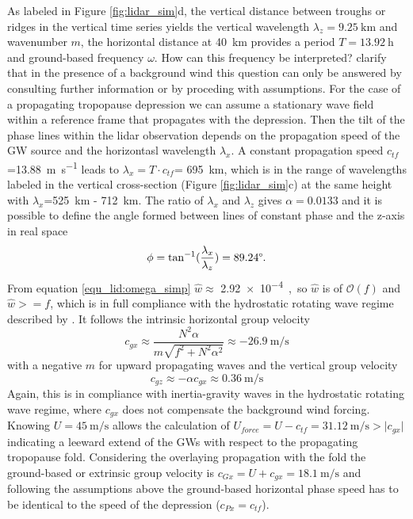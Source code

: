As labeled in Figure \ref{fig:lidar_sim}d, the vertical distance between troughs or ridges in the vertical time series yields the vertical wavelength $\lambda_z=\SI{9.25}{\kilo \meter}$ and wavenumber $m$, the horizontal distance at \SI{40}{\kilo \meter} provides a period $T=\SI{13.92}{\hour}$ and ground-based frequency $\omega$. How can this frequency be interpreted? \textcite[]{dornbrack_interpretation_2017} clarify that in the presence of a background wind this question can only be answered by consulting further information or by proceding with assumptions. For the case of a propagating tropopause depression we can assume a stationary wave field within a reference frame that propagates with the depression. Then the tilt of the phase lines within the lidar observation depends on the propagation speed of the GW source and the horizontasl wavelength $\lambda_x$. A constant propagation speed $c_{tf}$=\SI{13.88}{\meter \per \second} leads to $\lambda_x = T \cdot c_{tf}$= \SI{695}{\kilo \meter}, which is in the range of wavelengths labeled in the vertical cross-section (Figure \ref{fig:lidar_sim}c) at the same height with $\lambda_x$=\SI{525}{\kilo \meter} - \SI{712}{\kilo \meter}. The ratio of $\lambda_x$ and $\lambda_z$ gives $\alpha=0.0133$ and it is possible to define the angle formed between lines of constant phase and the z-axis in real space
\begin{equation}
    \phi = \tan^{-1}(\frac{\lambda_x}{\lambda_z})=89.24\degree.
    \label{equ_lid:phi}
\end{equation}
From equation \ref{equ_lid:omega_simp} $\hat{w}\approx$ \SI{2.92e-4}, so $\hat{w}$ is of $\mathcal{O}(f)$ and $\hat{w}>=f$, which is in full compliance with the hydrostatic rotating wave regime described by \textcite[]{gill_atmosphere-ocean_1982}. It follows the intrinsic horizontal group velocity
\begin{equation}
    c_{gx} \approx \frac{N^2 \alpha}{m \sqrt{f^2+N^2 \alpha^2}} \approx \SI{-26.9}{\meter\per\second} 
    \label{equ_lid:cgh}
\end{equation}
with a negative $m$ for upward propagating waves and the vertical group velocity
\begin{equation}
    c_{gz} \approx -\alpha c_{gx} \approx \SI{0.36}{\meter\per\second}
    \label{equ_lid:cgz}
\end{equation}
Again, this is in compliance with inertia-gravity waves in the hydrostatic rotating wave regime, where $c_{gx}$ does not compensate the background wind forcing. Knowing $U=\SI{45}{\meter\per\second}$ allows the calculation of $U_{force}=U-c_{tf}=\SI{31.12}{\meter\per\second}>\lvert c_{gx} \rvert$ indicating a leeward extend of the GWs with respect to the propagating tropopause fold. Considering the overlaying propagation with the fold the ground-based or extrinsic group velocity is $c_{Gx}=U+c_{gx}=\SI{18.1}{\meter\per\second}$ and following the assumptions above the ground-based horizontal phase speed has to be identical to the speed of the depression ($c_{Px} = c_{tf}$). \\

